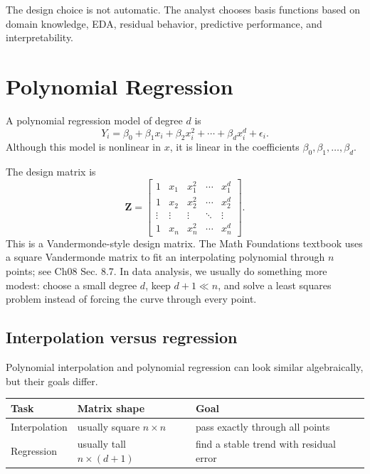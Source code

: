 The design choice is not automatic.  The analyst chooses basis functions based on domain knowledge, EDA, residual behavior, predictive performance, and interpretability.

\section{Polynomial Regression}

A polynomial regression model of degree \(d\) is
\begin{equation}
  Y_i=\beta_0+\beta_1x_i+\beta_2x_i^2+\cdots+\beta_dx_i^d+\epsilon_i.
  \label{eq:ch11-polynomial-regression}
\end{equation}
Although this model is nonlinear in \(x\), it is linear in the coefficients \(\beta_0,\beta_1,\ldots,\beta_d\).

The design matrix is
\begin{equation}
  \mathbf{Z}=\begin{bmatrix}
    1 & x_1 & x_1^2 & \cdots & x_1^d \\
    1 & x_2 & x_2^2 & \cdots & x_2^d \\
    \vdots & \vdots & \vdots & \ddots & \vdots \\
    1 & x_n & x_n^2 & \cdots & x_n^d
  \end{bmatrix}.
  \label{eq:ch11-polynomial-design}
\end{equation}
This is a Vandermonde-style design matrix.  The Math Foundations textbook uses a square Vandermonde matrix to fit an interpolating polynomial through \(n\) points; see Ch08 Sec. 8.7.  In data analysis, we usually do something more modest: choose a small degree \(d\), keep \(d+1\ll n\), and solve a least squares problem instead of forcing the curve through every point.

\subsection*{Interpolation versus regression}

Polynomial interpolation and polynomial regression can look similar algebraically, but their goals differ.

\begin{center}
\begin{tabular}{lll}
\toprule
Task & Matrix shape & Goal \\
\midrule
Interpolation & usually square \(n\times n\) & pass exactly through all points \\
Regression & usually tall \(n\times(d+1)\) & find a stable trend with residual error \\
\bottomrule
\end{tabular}
\end{center}

